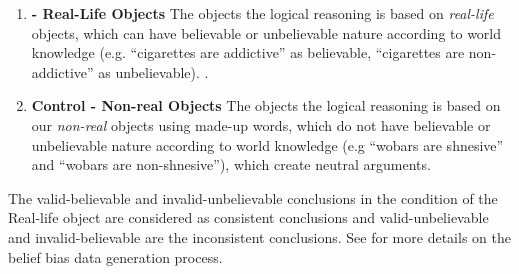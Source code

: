\begin{enumerate}
    \item \textbf{\Biaseddataset{} - Real-Life Objects } The objects the logical reasoning is based on \textit{real-life} objects, which can have believable or unbelievable nature according to world knowledge (e.g. ``cigarettes are addictive'' as believable, ``cigarettes are non-addictive'' as unbelievable).
    .\item \textbf{Control - Non-real Objects}  The objects the logical reasoning is based on our \textit{non-real} objects using made-up words, which do not have believable or unbelievable nature according to world knowledge (e.g ``wobars are shnesive'' and ``wobars are non-shnesive''), which create neutral arguments.
\end{enumerate}

The valid-believable and invalid-unbelievable conclusions in the condition of the Real-life object are considered as consistent conclusions and valid-unbelievable and invalid-believable are the inconsistent conclusions.
See \citet{dasgupta2022language} for more details on the belief bias data generation process.




